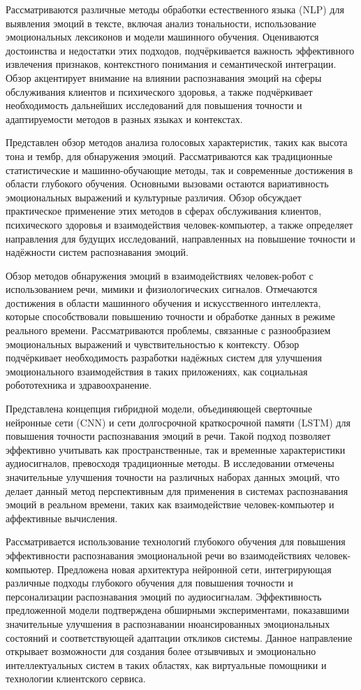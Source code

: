  Рассматриваются различные методы обработки естественного языка (NLP) для выявления эмоций в тексте, включая анализ тональности, использование эмоциональных лексиконов и модели машинного обучения. Оцениваются достоинства и недостатки этих подходов, подчёркивается важность эффективного извлечения признаков, контекстного понимания и семантической интеграции. Обзор акцентирует внимание на влиянии распознавания эмоций на сферы обслуживания клиентов и психического здоровья, а также подчёркивает необходимость дальнейших исследований для повышения точности и адаптируемости методов в разных языках и контекстах.
	
 Представлен обзор методов анализа голосовых характеристик, таких как высота тона и тембр, для обнаружения эмоций. Рассматриваются как традиционные статистические и машинно-обучающие методы, так и современные достижения в области глубокого обучения. Основными вызовами остаются вариативность эмоциональных выражений и культурные различия. Обзор обсуждает практическое применение этих методов в сферах обслуживания клиентов, психического здоровья и взаимодействия человек-компьютер, а также определяет направления для будущих исследований, направленных на повышение точности и надёжности систем распознавания эмоций.
	
 Обзор методов обнаружения эмоций в взаимодействиях человек-робот с использованием речи, мимики и физиологических сигналов. Отмечаются достижения в области машинного обучения и искусственного интеллекта, которые способствовали повышению точности и обработке данных в режиме реального времени. Рассматриваются проблемы, связанные с разнообразием эмоциональных выражений и чувствительностью к контексту. Обзор подчёркивает необходимость разработки надёжных систем для улучшения эмоционального взаимодействия в таких приложениях, как социальная робототехника и здравоохранение.
	
 Представлена концепция гибридной модели, объединяющей сверточные нейронные сети (CNN) и сети долгосрочной краткосрочной памяти (LSTM) для повышения точности распознавания эмоций в речи. Такой подход позволяет эффективно учитывать как пространственные, так и временные характеристики аудиосигналов, превосходя традиционные методы. В исследовании отмечены значительные улучшения точности на различных наборах данных эмоций, что делает данный метод перспективным для применения в системах распознавания эмоций в реальном времени, таких как взаимодействие человек-компьютер и аффективные вычисления.
	
 Рассматривается использование технологий глубокого обучения для повышения эффективности распознавания эмоциональной речи во взаимодействиях человек-компьютер. Предложена новая архитектура нейронной сети, интегрирующая различные подходы глубокого обучения для повышения точности и персонализации распознавания эмоций по аудиосигналам. Эффективность предложенной модели подтверждена обширными экспериментами, показавшими значительные улучшения в распознавании нюансированных эмоциональных состояний и соответствующей адаптации откликов системы. Данное направление открывает возможности для создания более отзывчивых и эмоционально интеллектуальных систем в таких областях, как виртуальные помощники и технологии клиентского сервиса.
 
